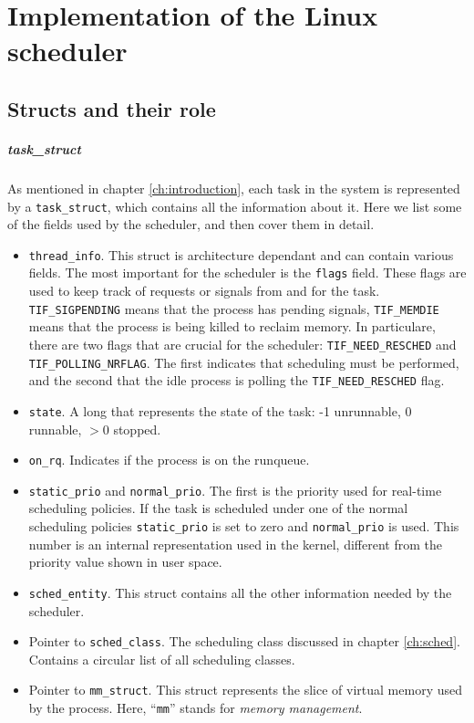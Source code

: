 \chapter{Implementation of the Linux scheduler}
\label{chap:implementation}

\section{Structs and their role}

\paragraph{task\_struct}
As mentioned in chapter \ref{ch:introduction}, each task in the system is represented \newline by a  \verb|task_struct|, which contains all the information about it. Here we list some of the fields used by the scheduler, and then cover them in detail.
\begin{itemize}
    \item \verb|thread_info|. This struct is architecture dependant and can contain various fields. The most important for the scheduler is the \verb|flags| field. These flags are used to keep track of requests or signals from and for the task. \verb|TIF_SIGPENDING| means that the process has pending signals, \verb|TIF_MEMDIE| means that the process is being killed to reclaim memory. In particulare, there are two flags that are crucial for the scheduler: \verb|TIF_NEED_RESCHED| and \verb|TIF_POLLING_NRFLAG|. The first indicates that scheduling must be performed, and the second that the idle process is polling the \verb|TIF_NEED_RESCHED| flag.
    \item \verb|state|. A long that represents the state of the task: -1 unrunnable, 0 runnable, $>0$ stopped. 
    \item \verb|on_rq|. Indicates if the process is on the runqueue.
    \item \verb|static_prio| and \verb|normal_prio|. The first is the priority used for real-time scheduling policies. If the task is scheduled under one of the normal scheduling policies \verb|static_prio| is set to zero and \verb|normal_prio| is used. This number is an internal representation used in the kernel, different from the priority value shown in user space.
    \item \verb|sched_entity|. This struct contains all the other information needed by the scheduler.
    \item Pointer to \verb|sched_class|. The scheduling class discussed in chapter \ref{ch:sched}. Contains a circular list of all scheduling classes.
    \item Pointer to \verb|mm_struct|. This struct represents the slice of virtual memory used by the process. Here, ``\verb|mm|'' stands for \textit{memory management}.
\end{itemize}

